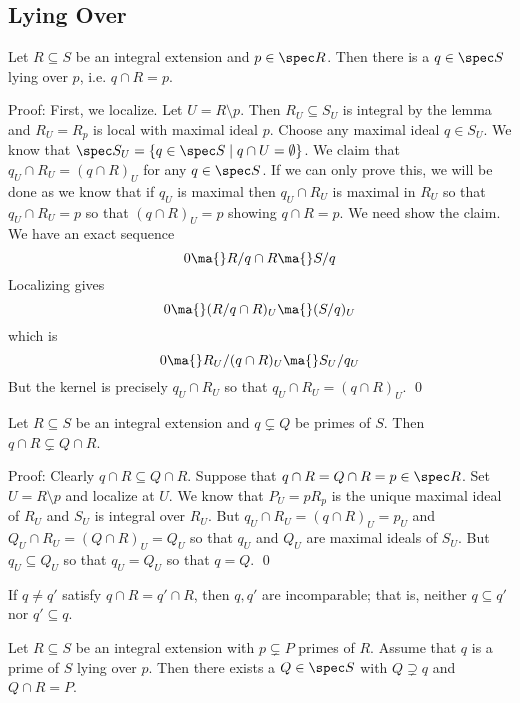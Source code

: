 \subsection{Lying Over}

\begin{thmm}
Let $R \subseteq S$ be an integral extension and $p \in \spec R$. Then there is a $q \in \spec S$ lying over $p$, i.e. $q \cap R=p$. 
\end{thmm}

\noindent Proof: First, we localize. Let $U=R \setminus p$. Then $R_U \subseteq S_U$ is integral by the lemma and $R_U=R_p$ is local with maximal ideal $p$. Choose any maximal ideal $q \in S_U$. We know that $\spec S_U=\{q \in \spec S \;|\; q \cap U=\emptyset\}$. We claim that $q_U \cap R_U=(q \cap R)_U$ for any $q \in \spec S$. If we can only prove this, we will be done as we know that if $q_U$ is maximal then $q_U \cap R_U$ is maximal in $R_U$ so that $q_U \cap R_U=p$ so that $(q \cap R)_U=p$ showing $q \cap R=p$. We need show the claim. We have an exact sequence
\[
0 \ma{} R/q \cap R \ma{} S/q
\]
Localizing gives
\[
0 \ma{} (R/q \cap R)_U \ma{} (S/q)_U
\]
which is
\[
0 \ma{} R_U/(q \cap R)_U \ma{} S_U/q_U
\]
But the kernel is precisely $q_U \cap R_U$ so that $q_U \cap R_U=(q\cap R)_U$. \qed \\

\begin{lem}[Incomparable]
Let $R \subseteq S$ be an integral extension and $q \subsetneq Q$ be primes of $S$. Then $q \cap R \subsetneq Q \cap R$.
\end{lem}

\noindent Proof: Clearly $q \cap R \subseteq Q \cap R$. Suppose that $q \cap R = Q \cap R=p \in \spec R$. Set $U=R \setminus p$ and localize at $U$. We know that $P_U= pR_p$ is the unique maximal ideal of $R_U$ and $S_U$ is integral over $R_U$. But $q_U \cap R_U=(q \cap R)_U=p_U$ and $Q_U \cap R_U=(Q \cap R)_U=Q_U$ so that $q_U$ and $Q_U$ are maximal ideals of $S_U$. But $q_U \subseteq Q_U$ so that $q_U=Q_U$ so that $q=Q$. \qed \\

\begin{cor}
If $q \neq q'$ satisfy $q \cap R = q' \cap R$, then $q,q'$ are incomparable; that is, neither $q \subseteq q'$ nor $q' \subseteq q$. 
\end{cor}

\begin{lem}[Going Up]
Let $R \subseteq S$ be an integral extension with $p \subsetneq P$ primes of $R$. Assume that $q$ is a prime of $S$ lying over $p$. Then there exists a $Q \in \spec S$ with $Q \supsetneq q$ and $Q \cap R=P$. 
\end{lem}

